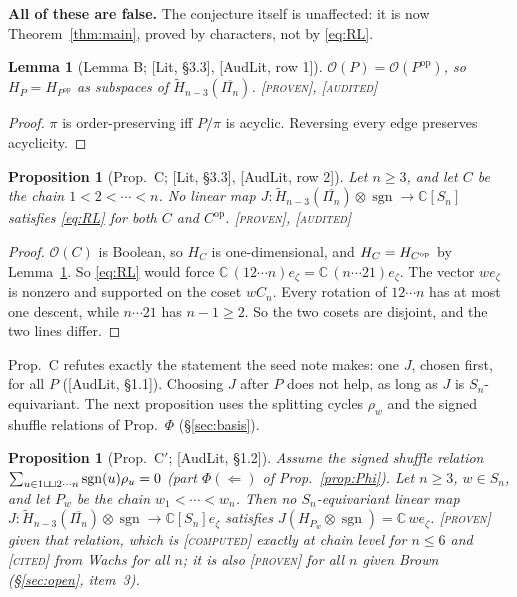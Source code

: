 \documentclass[11pt]{article}
\newtheorem{proposition}[theorem]{Proposition}
\newtheorem{lemma}[theorem]{Lemma}
\theoremstyle{definition}
\theoremstyle{remark}
\newcommand{\OP}{\mathcal O}
\newcommand{\sgn}{\operatorname{sgn}}
\newcommand{\shuf}{\mathbin{\sqcup\mkern-3mu\sqcup}}
\newcommand{\st}[1]{\textup{[\textsc{#1}]}}
\begin{document}
\textbf{All of these are false.} The conjecture itself is unaffected: it is
now Theorem~\ref{thm:main}, proved by characters, not by
\eqref{eq:RL}.

\begin{lemma}[Lemma B; {[Lit, \S3.3]}, {[AudLit, row 1]}]\label{lem:op}
$\OP(P)=\OP(P^{\mathrm{op}})$, so $H_P=H_{P^{\mathrm{op}}}$ as subspaces of
$\widetilde H_{n-3}(\overline{\Pi_n})$. \st{proven}, \st{audited}
\end{lemma}

\begin{proof}
$\pi$ is order-preserving iff $P/\pi$ is acyclic. Reversing every edge
preserves acyclicity.
\end{proof}

\begin{proposition}[Prop.~C; {[Lit, \S3.3]}, {[AudLit, row 2]}]\label{prop:C}
Let $n\ge3$, and let $C$ be the chain $1<2<\cdots<n$. No linear map
$J:\widetilde H_{n-3}(\overline{\Pi_n})\otimes\sgn\to\mathbb C[S_n]$
satisfies \eqref{eq:RL} for both $C$ and $C^{\mathrm{op}}$. \st{proven},
\st{audited}
\end{proposition}

\begin{proof}
$\OP(C)$ is Boolean, so $H_C$ is one-dimensional, and $H_C=H_{C^{\rm op}}$ by
Lemma~\ref{lem:op}. So \eqref{eq:RL} would force
$\mathbb C\,(12\cdots n)e_\zeta=\mathbb C\,(n\cdots21)e_\zeta$. The vector
$we_\zeta$ is nonzero and supported on the coset $wC_n$. Every rotation of
$12\cdots n$ has at most one descent, while $n\cdots21$ has $n-1\ge2$. So
the two cosets are disjoint, and the two lines differ.
\end{proof}

Prop.~C refutes exactly the statement the seed note makes: one $J$, chosen
first, for all $P$ ([AudLit, \S1.1]). Choosing $J$ after $P$ does not help,
as long as $J$ is $S_n$-equivariant. The next proposition uses the splitting
cycles $\rho_w$ and the signed shuffle relations of Prop.~$\Phi$
(\S\ref{sec:basis}).

\begin{proposition}[Prop.~C$'$; {[AudLit, \S1.2]}]\label{prop:Cprime}
Assume the signed shuffle relation $\sum_{u\in1\shuf 2\cdots n}\sgn(u)\rho_u=0$
(part $\Phi(\Leftarrow)$ of Prop.~\ref{prop:Phi}). Let $n\ge3$, $w\in S_n$,
and let $P_w$ be the chain $w_1<\cdots<w_n$. Then no $S_n$-equivariant
linear map $J:\widetilde H_{n-3}(\overline{\Pi_n})\otimes\sgn\to\mathbb C[S_n]e_\zeta$
satisfies $J(H_{P_w}\otimes\sgn)=\mathbb C\,we_\zeta$. \st{proven} given that
relation, which is \st{computed} exactly at chain level for $n\le6$ and
\st{cited} from Wachs for all $n$; it is also \st{proven} for all $n$
given Brown (\S\ref{sec:open}, item~3).
\end{proposition}
\end{document}
